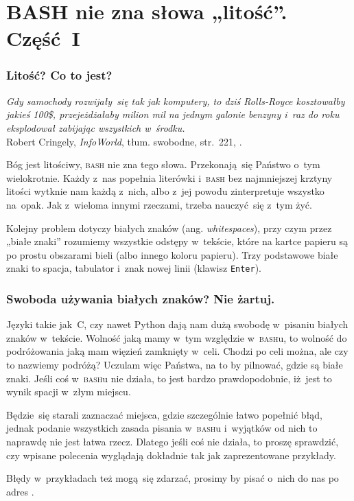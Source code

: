 \documentclass[10pt,t]{beamer}
\begin{document}
\section{BASH nie zna słowa „litość”. Część~I}


\begin{frame}
  \frametitle{Litość? Co to jest?}


  \textit{Gdy samochody rozwijały~się tak jak komputery, to dziś
    Rolls-Royce kosztowałby jakieś 100\$, przejeżdżałaby milion mil na
    jednym galonie benzyny i~raz do roku eksplodował zabijając wszystkich
    w~środku.} \\
  Robert Cringely, \textit{InfoWorld}, tłum. swobodne, str.~221,
  \parencite{Garfinkel-Weise-Strassmann-The-UNIX-HATERS-Handbook-Pub-1994}.

  Bóg jest litościwy, \textsc{bash} nie zna tego słowa. Przekonają~się
  Państwo o~tym wielokrotnie. Każdy z~nas popełnia literówki i~\textsc{bash}
  bez najmniejszej krztyny litości wytknie nam każdą z~nich, albo
  z~jej powodu zinterpretuje wszystko na~opak. Jak z~wieloma innymi
  rzeczami, trzeba nauczyć~się z~tym żyć.

  Kolejny problem dotyczy białych znaków (ang. \textit{whitespaces}), przy
  czym przez „białe znaki” rozumiemy wszystkie odstępy w~tekście, które na
  kartce papieru są po prostu obszarami bieli (albo innego koloru papieru).
  Trzy podstawowe białe znaki to spacja, tabulator i~znak nowej linii
  (klawisz \texttt{Enter}).

\end{frame}





\begin{frame}
  \frametitle{Swoboda używania białych znaków? Nie żartuj.}


  Języki takie jak~C, czy nawet Python dają nam dużą swobodę
  w~pisaniu białych znaków w~tekście. Wolność jaką mamy w~tym względzie
  w~\textsc{bash}u, to wolność do podróżowania jaką mam więzień zamknięty
  w~celi. Chodzi po celi można, ale czy to nazwiemy podróżą? Uczulam więc
  Państwa, na to by pilnować, gdzie są białe znaki. Jeśli coś
  w~\textsc{bash}u nie działa, to jest bardzo prawdopodobnie, iż~jest to
  wynik spacji w~złym miejscu.

  Będzie~się starali zaznaczać miejsca, gdzie szczególnie łatwo popełnić
  błąd, jednak podanie wszystkich zasada pisania w~\textsc{bash}u i~wyjątków
  od nich to naprawdę nie jest łatwa rzecz. Dlatego jeśli coś nie działa,
  to proszę sprawdzić, czy wpisane polecenia wyglądają \alert{dokładnie}
  tak jak zaprezentowane przykłady.

  Błędy w~przykładach też mogą~się zdarzać, prosimy by pisać o~nich do nas
  po adres \email.

\end{frame}
\end{document}
